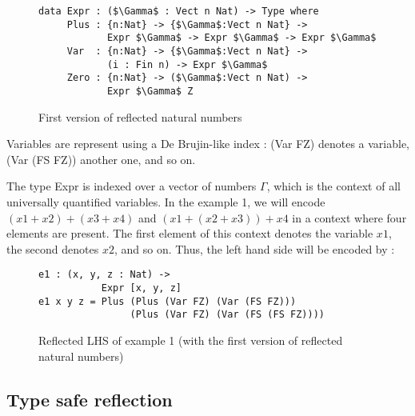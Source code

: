 \begin{figure}[H]
\figrule
\begin{center}
\begin{lstlisting}
data Expr : ($\Gamma$ : Vect n Nat) -> Type where
     Plus : {n:Nat} -> {$\Gamma$:Vect n Nat} -> 
            Expr $\Gamma$ -> Expr $\Gamma$ -> Expr $\Gamma$
     Var  : {n:Nat} -> {$\Gamma$:Vect n Nat} -> 
            (i : Fin n) -> Expr $\Gamma$
     Zero : {n:Nat} -> ($\Gamma$:Vect n Nat) -> 
            Expr $\Gamma$ Z
\end{lstlisting}
\end{center}
\caption{First version of reflected natural numbers}
\figrule
\end{figure}


Variables are represent using a De Brujin-like index : (Var FZ) denotes a variable, (Var (FS FZ)) another one, and so on.

The type Expr is indexed over a vector of numbers $\Gamma$, which is the context of all universally quantified variables. In the example 1, we will encode $(x1 + x2) + (x3 + x4)$ and $(x1 + (x2 + x3)) + x4$ in a context where four elements are present. The first element of this context denotes the variable $x1$, the second denotes $x2$, and so on.
Thus, the left hand side will be encoded by :

\begin{figure}[H]
\figrule
\begin{center}
\begin{lstlisting}
e1 : (x, y, z : Nat) -> 
           Expr [x, y, z]
e1 x y z = Plus (Plus (Var FZ) (Var (FS FZ))) 
                (Plus (Var FZ) (Var (FS (FS FZ))))
\end{lstlisting}
\end{center}
\caption{Reflected LHS of example 1 (with the first version of reflected natural numbers)}
\figrule
\end{figure}

\subsection{Type safe reflection}

